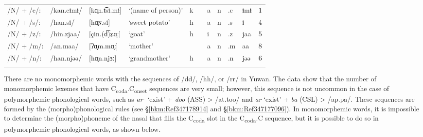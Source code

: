 \begin{sidewaystable}
\begin{tabular}{ *{10}{l} S[table-format=1] }
{/N/ + /c/:} & {/kan.cɨmɨ/}      & [kɑ̟n.t͡sɨ.mɨ]      &  {‘(name of person)’}  &  k  & &    a  &  n   &  .c & ɨmɨ & 1\\
{/N/ + /s/:} & {/han.sɨ/}        & [hɑ̟ɴ.sɨ]           &  {‘sweet potato’}      &  h  & &    a  &  n   &  .s & ɨ & 4\\
{/N/ + /z/:} & {/hin.zjaa/}      & [çin.(d͡)ʑɑ̟ː]      &  {‘goat’}              &  h  & &    i  &  n   &  .z & jaa & 5\\
{/N/ + /m/:} & {/an.maa/}        & [ʔɑ̟m.mɑ̟ː]         &   {‘mother’}           &  &   &a   &     n &   .m  &  aa & 8\\
{/N/ + /n/:} & {/han.njəə/}      & [hɑ̟n.njɜː]         &  {‘grandmother’}       &  h  &  &    a  &  n    & .n & jəə & 6\\
\lspbottomrule
\end{tabular}
\end{sidewaystable}

There are no monomorphemic words with the sequences of /dd/, /hh/, or /rr/ in Yuwan. The data show that the number of monomorphemic lexemes that have C\textsubscript{coda}.C\textsubscript{onset} sequences are very small; however, this sequence is not uncommon in the case of polymorphemic phonological words, such as \textit{ar-} ‘exist’ + \textit{doo} (ASS) > /at.too/ and \textit{ar} ‘exist’ + \textit{ba} (CSL) > /ap.pa/. These sequences are formed by the (morpho)phonological rules (see §\ref{bkm:Ref347178914} and §\ref{bkm:Ref347177096}). In monomorphemic words, it is impossible to determine the (morpho)phoneme of the nasal that fills the C\textsubscript{coda} slot in the C\textsubscript{coda}.C sequence, but it is possible to do so in polymorphemic phonological words, as shown below.


